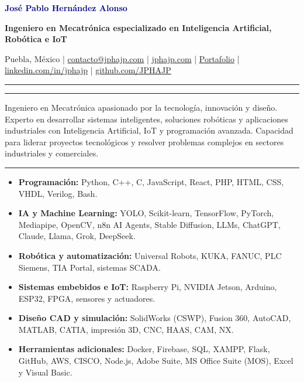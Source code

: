 \documentclass[10pt,letterpaper]{article}
\newcommand{\sectionline}{\vspace{-2pt}\textcolor{accent}{\rule{\linewidth}{0.8pt}}\vspace{1pt}}
\newcommand{\cvsection}[1]{\vspace{5pt}{\large\bfseries\textcolor{navy}{#1}}\par\sectionline}
\begin{document}
\color{text}

{\Huge\bfseries\textcolor{navy}{Jos\'{e} Pablo Hern\'{a}ndez Alonso}}\par
{\large\bfseries Ingeniero en Mecatr\'{o}nica especializado en Inteligencia Artificial, Rob\'{o}tica e IoT}\par
\vspace{2pt}
Puebla, M\'{e}xico \; | \; \href{mailto:contacto@jphajp.com}{contacto@jphajp.com} \; | \; \href{https://jphajp.com/}{jphajp.com} \; | \; \href{https://jphajp.github.io/JPHAJP/}{Portafolio} \; | \; \href{https://www.linkedin.com/in/jphajp}{linkedin.com/in/jphajp} \; | \; \href{https://github.com/JPHAJP}{github.com/JPHAJP}
\par\vspace{3pt}\textcolor{accent}{\rule{\linewidth}{1.8pt}}

\cvsection{Perfil profesional}
Ingeniero en Mecatr\'{o}nica apasionado por la tecnolog\'{i}a, innovaci\'{o}n y dise\~{n}o. Experto en desarrollar sistemas inteligentes, soluciones rob\'{o}ticas y aplicaciones industriales con Inteligencia Artificial, IoT y programaci\'{o}n avanzada. Capacidad para liderar proyectos tecnol\'{o}gicos y resolver problemas complejos en sectores industriales y comerciales.

\cvsection{Competencias t\'{e}cnicas}
\begin{itemize}
  \item \textbf{Programaci\'{o}n:} Python, C++, C, JavaScript, React, PHP, HTML, CSS, VHDL, Verilog, Bash.
  \item \textbf{IA y Machine Learning:} YOLO, Scikit-learn, TensorFlow, PyTorch, Mediapipe, OpenCV, n8n AI Agents, Stable Diffusion, LLMs, ChatGPT, Claude, Llama, Grok, DeepSeek.
  \item \textbf{Rob\'{o}tica y automatizaci\'{o}n:} Universal Robots, KUKA, FANUC, PLC Siemens, TIA Portal, sistemas SCADA.
  \item \textbf{Sistemas embebidos e IoT:} Raspberry Pi, NVIDIA Jetson, Arduino, ESP32, FPGA, sensores y actuadores.
  \item \textbf{Dise\~{n}o CAD y simulaci\'{o}n:} SolidWorks (CSWP), Fusion 360, AutoCAD, MATLAB, CATIA, impresi\'{o}n 3D, CNC, HAAS, CAM, NX.
  \item \textbf{Herramientas adicionales:} Docker, Firebase, SQL, XAMPP, Flask, GitHub, AWS, CISCO, Node.js, Adobe Suite, MS Office Suite (MOS), Excel y Visual Basic.
\end{itemize}
\end{document}
